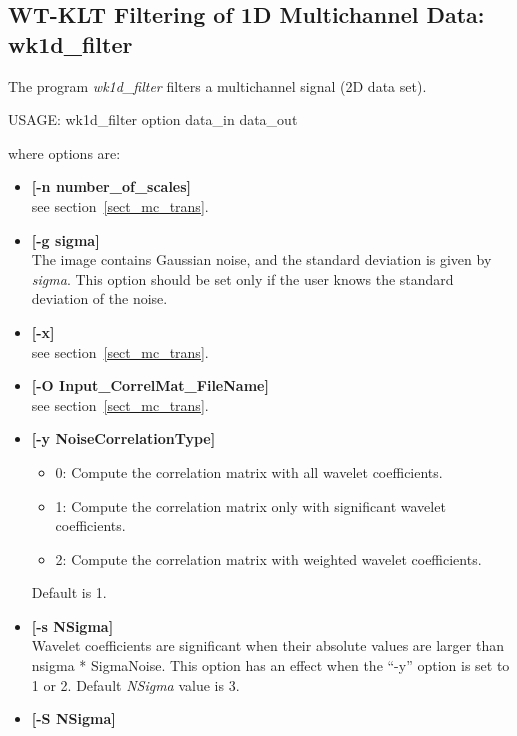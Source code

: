 \subsection{WT-KLT Filtering of 1D Multichannel Data: wk1d\_filter}
\label{sect_mc1d_filter}
The program 
{\em wk1d\_filter} filters 
a multichannel signal (2D data set).
{\bf
\begin{center}
 USAGE: wk1d\_filter option data\_in data\_out
\end{center}}
where options are: 
\begin{itemize} 
\baselineskip=0.4truecm
 \itemsep=0.1truecm

\item {\bf [-n number\_of\_scales]}\\
see section~\ref{sect_mc_trans}.  
\item {\bf [-g sigma]}\\
 The image contains Gaussian noise, and the standard deviation is
given by {\em sigma}. This option should be set only if the user
knows the standard deviation of the noise. 
\item {\bf [-x]} \\
see section~\ref{sect_mc_trans}.  
\item {\bf [-O Input\_CorrelMat\_FileName]} \\
see section~\ref{sect_mc_trans}.  
\item {\bf [-y NoiseCorrelationType]}
{\small
\begin{itemize}             
\baselineskip=0.4truecm
\itemsep=0.1truecm
\item{0:} Compute the correlation matrix with all wavelet coefficients. 
\item{1:} Compute the correlation matrix only with significant wavelet coefficients. 
\item{2:} Compute the correlation matrix with weighted wavelet coefficients. 
\end{itemize}
} 
Default is 1.     
\item {\bf [-s NSigma]} \\
Wavelet coefficients are significant when their absolute values are larger
than nsigma * SigmaNoise. This option has an effect when 
the ``-y'' option is set to 1 or 2.
Default {\em NSigma} value is  3. 
\item {\bf [-S NSigma]} \\

\end{itemize}
